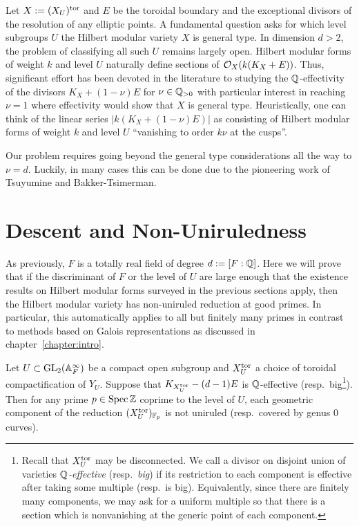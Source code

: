 \documentclass[main.tex]{subfiles}
\begin{document}
{Let $X := (X_U)^{\mathrm{tor}}$ and $E$ be the toroidal boundary and the exceptional divisors of the resolution of any elliptic points. A fundamental question asks for which level subgroups $U$ the Hilbert modular variety $X$ is general type. In dimension $d > 2$, the problem of classifying all such $U$ remains largely open. Hilbert modular forms of weight $k$ and level $U$ naturally define sections of $\mathcal{O}_X(k(K_X + E))$. Thus, significant effort has been devoted in the literature to studying the $\mathbb{Q}$-effectivity of the divisors $K_X + (1 - \nu) E$ for $\nu \in \mathbb{Q}_{>0}$ with particular interest in reaching $\nu = 1$ where effectivity would show that $X$ is general type. Heuristically, one can think of the linear series $|k(K_X + (1 - \nu) E)|$ as consisting of Hilbert modular forms of weight $k$ and level $U$ ``vanishing to order $k \nu$ at the cusps''. 
\par 
Our problem requires going beyond the general type considerations all the way to $\nu = d$. Luckily, in many cases this can be done due to the pioneering work of Tsuyumine and Bakker-Tsimerman. 

\section{Descent and Non-Uniruledness}


As previously, $F$ is a totally real field of degree $d := [F : \mathbb{Q}]$. Here we will prove that if the discriminant of $F$ or the level of $U$ are large enough that the existence results on Hilbert modular forms surveyed in the previous sections apply, then the Hilbert modular variety has non-uniruled reduction at good primes. In particular, this automatically applies to all but finitely many primes in contrast to methods based on Galois representations as discussed in chapter~\ref{chapter:intro}.   

\begin{theorem} \label{thm:main_hilbert_non-uniruled}
Let $U \subset \mathrm{GL}_2(\mathbb{A}_F^{\infty})$ be a compact open subgroup and $X_U^{\mathrm{tor}}$ a choice of toroidal compactification of $Y_U$. Suppose that $K_{X_U^{\mathrm{tor}}} - (d-1) E$ is $\mathbb{Q}$-effective (resp.\ big\footnote{Recall that $X_U^{\mathrm{tor}}$ may be disconnected. We call a divisor on disjoint union of varieties \textit{$\mathbb{Q}$-effective} (resp.\ \textit{big}) if its restriction to each component is effective after taking some multiple (resp.\ is big). Equivalently, since there are finitely many components, we may ask for a uniform multiple so that there is a section which is nonvanishing at the generic point of each component.}). Then for any prime $p \in \operatorname{\mathrm{Spec}}{\mathbb{Z}}$ coprime to the level of $U$, each geometric component of the reduction $(X_U^{\mathrm{tor}})_{\mathbb{F}_p}$ is not uniruled (resp.\ covered by genus $0$ curves). 
\end{theorem}

}
\end{document}
